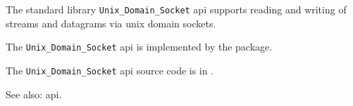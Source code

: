 
The standard library {\tt Unix\_Domain\_Socket} api supports reading and writing 
of streams and datagrams via unix domain sockets.

The {\tt Unix\_Domain\_Socket} api is implemented by the  package.

The {\tt Unix\_Domain\_Socket} api source code is in .

See also:  api.
